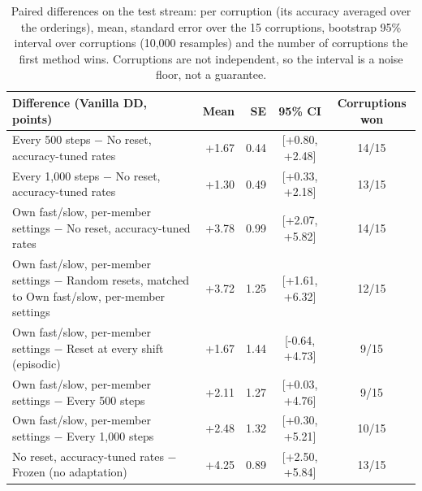 \begin{table}[t]
  \centering\small
  \begin{tabular}{@{}lrrcc@{}}
    \toprule
    Difference (Vanilla DD, points) & Mean & SE & 95\% CI & Corruptions won \\
    \midrule
    Every 500 steps $-$ No reset, accuracy-tuned rates & +1.67 & 0.44 & [+0.80, +2.48] & 14/15 \\
    Every 1,000 steps $-$ No reset, accuracy-tuned rates & +1.30 & 0.49 & [+0.33, +2.18] & 13/15 \\
    Own fast/slow, per-member settings $-$ No reset, accuracy-tuned rates & +3.78 & 0.99 & [+2.07, +5.82] & 14/15 \\
    Own fast/slow, per-member settings $-$ Random resets, matched to Own fast/slow, per-member settings & +3.72 & 1.25 & [+1.61, +6.32] & 12/15 \\
    Own fast/slow, per-member settings $-$ Reset at every shift (episodic) & +1.67 & 1.44 & [-0.64, +4.73] & 9/15 \\
    Own fast/slow, per-member settings $-$ Every 500 steps & +2.11 & 1.27 & [+0.03, +4.76] & 9/15 \\
    Own fast/slow, per-member settings $-$ Every 1,000 steps & +2.48 & 1.32 & [+0.30, +5.21] & 10/15 \\
    No reset, accuracy-tuned rates $-$ Frozen (no adaptation) & +4.25 & 0.89 & [+2.50, +5.84] & 13/15 \\
    \bottomrule
  \end{tabular}
  \caption{Paired differences on the test stream: per corruption (its accuracy averaged over the orderings), mean, standard error over the 15 corruptions, bootstrap 95\% interval over corruptions (10,000 resamples) and the number of corruptions the first method wins. Corruptions are not independent, so the interval is a noise floor, not a guarantee.}
  \label{tab:final_paired}
\end{table}
